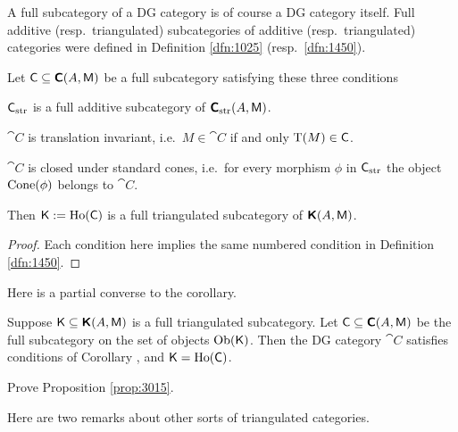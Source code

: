 A full subcategory of a DG category is of course a DG category itself. 
Full additive (resp.\ triangulated) subcategories of additive
(resp.\ triangulated) categories were defined in 
Definition \ref{dfn:1025} (resp.\ \ref{dfn:1450}). 

\begin{cor} \label{cor:3015}
Let $\operatorname{\mathsf{C}} \subseteq \boldsymbol{\mathsf{C}}(A, \operatorname{\mathsf{M}})$ be a full subcategory satisfying these 
three conditions\tup{:}
\begin{itemize}
 $\operatorname{\mathsf{C}}_{\mathrm{str}}$ is a full additive subcategory of 
$\boldsymbol{\mathsf{C}}_{\mathrm{str}}(A, \operatorname{\mathsf{M}})$. 

 $\cat{C}$ is translation invariant, i.e.\
$M \in \cat{C}$ if and only $\operatorname{T}(M) \in \operatorname{\mathsf{C}}$.

 $\cat{C}$ is closed under standard cones, i.e.\ for every morphism 
$\phi$ in $\operatorname{\mathsf{C}}_{\mathrm{str}}$ the object $\operatorname{Cone}(\phi)$ belongs to 
$\cat{C}$.
\end{itemize}
Then $\operatorname{\mathsf{K}} := \operatorname{Ho}(\operatorname{\mathsf{C}})$
is a full triangulated subcategory of 
$\boldsymbol{\mathsf{K}}(A, \operatorname{\mathsf{M}})$. 
\end{cor}

\begin{proof}
Each condition here implies the same numbered condition in Definition 
\ref{dfn:1450}. 
\end{proof}

Here is a partial converse to the corollary. 

\begin{prop} \label{prop:3015}
Suppose $\operatorname{\mathsf{K}} \subseteq \boldsymbol{\mathsf{K}}(A, \operatorname{\mathsf{M}})$ is a full triangulated subcategory. 
Let $\operatorname{\mathsf{C}} \subseteq \boldsymbol{\mathsf{C}}(A, \operatorname{\mathsf{M}})$ be the full subcategory on the set of 
objects $\operatorname{Ob}(\operatorname{\mathsf{K}})$. Then the DG category $\cat{C}$ satisfies 
conditions \tup{(a)-(c)} of Corollary \tup{\ref{cor:3015}}, and 
$\operatorname{\mathsf{K}} = \operatorname{Ho}(\operatorname{\mathsf{C}})$.
\end{prop}

\begin{exer} \label{exer:3015}
Prove Proposition \ref{prop:3015}. 
\end{exer}

Here are two remarks about other sorts of triangulated categories.

